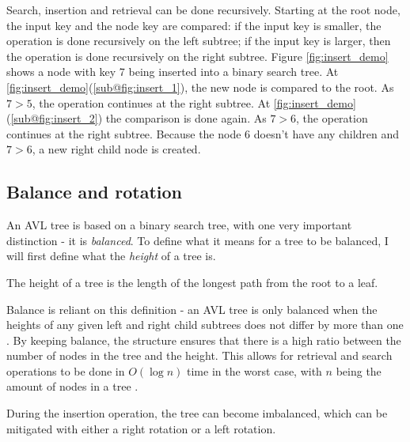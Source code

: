 Search, insertion and retrieval can be done recursively. Starting at the root node, the input key and the node key are compared: if the input key is smaller,
the operation is done recursively on the left subtree; if the input key is larger, then the operation is done recursively on the right subtree. Figure \ref{fig:insert_demo} shows 
a node with key 7 being inserted into a binary search tree. At \ref{fig:insert_demo}(\ref{sub@fig:insert_1}), the new node is compared to the root. As $7 > 5$, the operation continues at 
the right subtree. At \ref{fig:insert_demo}(\ref{sub@fig:insert_2}) the comparison is done again. As $7 > 6$, the operation continues at the right subtree. Because the node 6 doesn't have any children and $7 > 6$,
a new right child node is created.

\subsection{Balance and rotation}
An AVL tree is based on a binary search tree, with one very important distinction - it is \textit{balanced}. To define what it means for a tree to be balanced, I will first
define what the \textit{height} of a tree is.

\begin{definition}
  \label{def:height}
  The height of a tree is the length of the longest path from the root to a leaf.
\end{definition} 
 
Balance is reliant on this definition - an AVL tree is only balanced when the 
heights of any given left and right child subtrees does not differ by more than one \cite{avl:original}. By keeping balance, the structure ensures that there is a high ratio between the number of 
nodes in the tree and the height. This allows for retrieval and search operations to be done in $O(\log n)$ time in the worst case, with $n$ being the amount of nodes in a tree \cite{avl:computer}.

During the insertion operation, the tree can become imbalanced, which can be mitigated
with either a right rotation or a left rotation. 